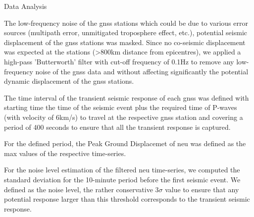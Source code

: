 \documentclass[final,a0,portrait]{beamer}
\newlength{\twocolwid}
\begin{document}
\begin{frame}[t]
\begin{columns}[t]
\begin{column}{\twocolwid}

\begin{block}{Data Analysis}

{\small
The low-frequency noise of the gnss stations which could be due to various error sources (multipath error, unmitigated troposphere effect, etc.), potential seismic displacement of the gnss stations was masked. Since no co-seismic displacement was expected at the stations (>800km distance from epicentres), we applied a high-pass 'Butterworth' filter with cut-off frequency of 0.1Hz to remove any low-frequency noise of the gnss data and without affecting significantly the potential dynamic displacement of the gnss stations.

The time interval of the transient seismic response of each gnss was defined with starting time the time of the seismic event plus the required time of P-waves (with velocity of 6km/s) to travel at the respective gnss station and covering a period of 400 seconds to ensure that all the transient response is captured.

For the defined period, the Peak Ground Displacemet of neu was defined as the max values of the respective time-series.

For the noise level estimation of the filtered neu time-series, we computed the standard deviation for the 10-minute period before the first seismic event. We defined as the noise level, the rather conservative 3$\sigma$ value to ensure that any potential response larger than this threshold corresponds to the transient seismic response.
}



\end{block}
\end{column}
\end{columns}
\end{frame}
\end{document}

